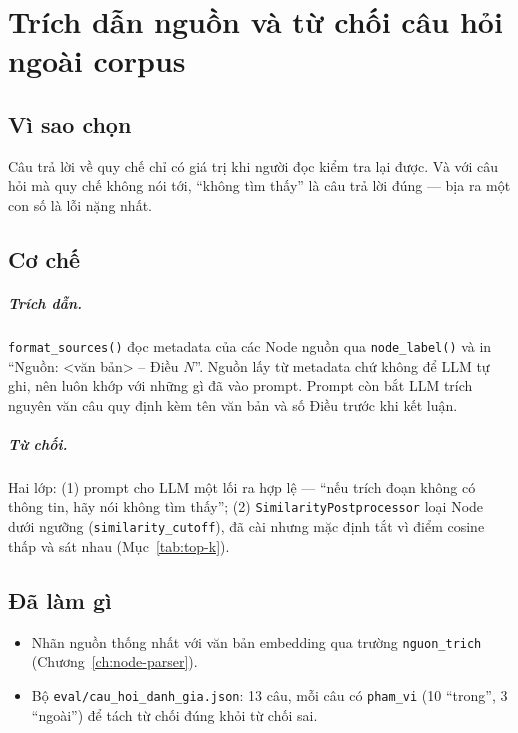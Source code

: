 \chapter{Trích dẫn nguồn và từ chối câu hỏi ngoài corpus}
\label{ch:trich-dan}

\section{Vì sao chọn}

Câu trả lời về quy chế chỉ có giá trị khi người đọc kiểm tra lại được. Và với câu hỏi mà quy chế không
nói tới, ``không tìm thấy'' là câu trả lời đúng --- bịa ra một con số là lỗi nặng nhất.

\section{Cơ chế}

\paragraph{Trích dẫn.} \texttt{format\_sources()} đọc metadata của các Node nguồn qua \texttt{node\_label()}
và in ``Nguồn: <văn bản> -- Điều $N$''. Nguồn lấy từ metadata chứ không để LLM tự ghi, nên luôn khớp với
những gì đã vào prompt. Prompt còn bắt LLM trích nguyên văn câu quy định kèm tên văn bản và số Điều
trước khi kết luận.

\paragraph{Từ chối.} Hai lớp: (1) prompt cho LLM một lối ra hợp lệ --- ``nếu trích đoạn không có thông
tin, hãy nói không tìm thấy''; (2) \texttt{SimilarityPostprocessor} loại Node dưới ngưỡng
(\texttt{similarity\_cutoff}), đã cài nhưng mặc định tắt vì điểm cosine thấp và sát nhau
(Mục~\ref{tab:top-k}).

\section{Đã làm gì}

\begin{itemize}
  \item Nhãn nguồn thống nhất với văn bản embedding qua trường \texttt{nguon\_trich} (Chương~\ref{ch:node-parser}).
  \item Bộ \texttt{eval/cau\_hoi\_danh\_gia.json}: 13 câu, mỗi câu có \texttt{pham\_vi} (10 ``trong'', 3 ``ngoài'')
        để tách từ chối đúng khỏi từ chối sai.
\end{itemize}

